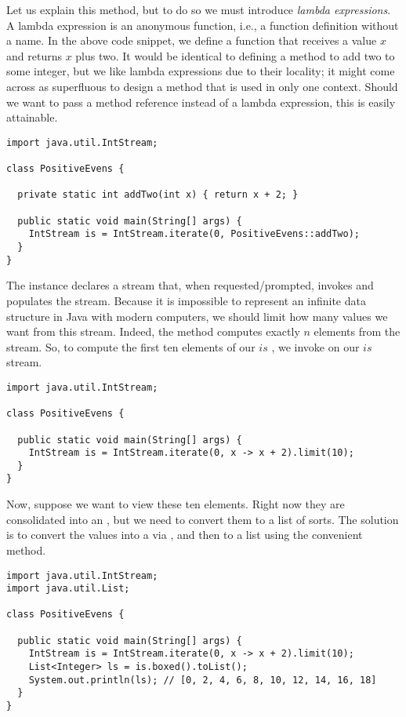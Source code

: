 Let us explain this method, but to do so we must introduce \textit{lambda expressions}. A lambda expression is an anonymous function, i.e., a function definition without a name. In the above code snippet, we define a function that receives a value $x$ and returns $x$ plus two. It would be identical to defining a  method to add two to some integer, but we like lambda expressions due to their locality; it might come across as superfluous to design a method that is used in only one context. Should we want to pass a method reference instead of a lambda expression, this is easily attainable.
\begin{cl}[]{}
\begin{lstlisting}[language=MyJava]
import java.util.IntStream;

class PositiveEvens {

  private static int addTwo(int x) { return x + 2; }

  public static void main(String[] args) {
    IntStream is = IntStream.iterate(0, PositiveEvens::addTwo);
  }
}   
\end{lstlisting}
\end{cl}

The  instance declares a stream that, when requested/prompted, invokes and populates the stream. Because it is impossible to represent an infinite data structure in Java with modern computers, we should limit how many values we want from this stream. Indeed, the  method computes exactly $n$ elements from the stream. So, to compute the first ten elements of our $\textit{is}$ , we invoke  on our $\textit{is}$ stream. 

\begin{cl}[]{}
\begin{lstlisting}[language=MyJava]
import java.util.IntStream;

class PositiveEvens {
  
  public static void main(String[] args) {
    IntStream is = IntStream.iterate(0, x -> x + 2).limit(10);
  }
}
\end{lstlisting}
\end{cl}
Now, suppose we want to view these ten elements. Right now they are consolidated into an , but we need to convert them to a list of sorts. The solution is to convert the values into a  via , and then to a list using the convenient  method.
\begin{cl}[]{}
\begin{lstlisting}[language=MyJava]
import java.util.IntStream;
import java.util.List;

class PositiveEvens {
  
  public static void main(String[] args) {
    IntStream is = IntStream.iterate(0, x -> x + 2).limit(10);
    List<Integer> ls = is.boxed().toList();
    System.out.println(ls); // [0, 2, 4, 6, 8, 10, 12, 14, 16, 18]
  }
}
\end{lstlisting}
\end{cl}

